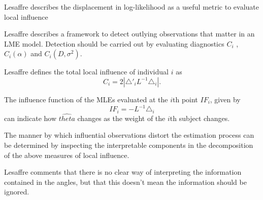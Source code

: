 \documentclass[Main.tex]{subfiles}
\begin{document}
Lesaffre  describes the displacement in log-likelihood as a useful metric to evaluate local influence %


Lesaffre describes a framework to detect outlying observations that matter in an LME model. Detection should be carried out by evaluating diagnostics $C_{i}$ , $C_{i}(\alpha)$ and $C_{i}(D,\sigma^2)$.


Lesaffre defines the total local influence of individual $i$ as
\begin{equation}
	C_{i} = 2 | \triangle \prime _{i} L^{-1} \triangle_{i}|.
\end{equation}


The influence function of the MLEs evaluated at the $i$th point $IF_{i}$, given by
\begin{equation}
	IF_{i} = -L^{-1}\triangle _{i}
\end{equation}
can indicate how $\hat{theta}$ changes as the weight of the $i$th
subject changes.

The manner by which influential observations distort the estimation process can be determined by inspecting the
interpretable components in the decomposition of the above measures of local influence.


Lesaffre comments that there is no clear way of interpreting the information contained in the angles, but that this doesn't mean the information should be ignored.
\end{document}
